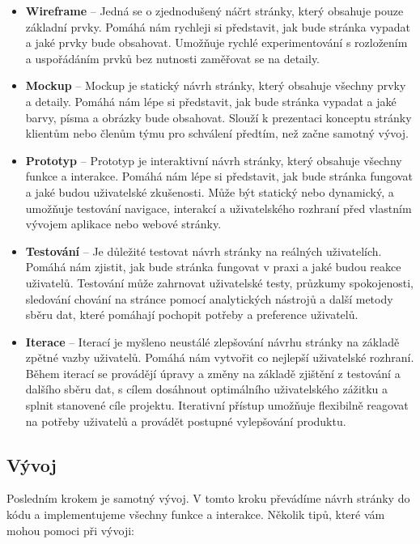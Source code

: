\begin{itemize}
  \item \textbf{Wireframe} -- Jedná se o zjednodušený náčrt stránky, který obsahuje pouze základní prvky. Pomáhá nám rychleji si představit, jak bude stránka vypadat a jaké prvky bude obsahovat. Umožňuje rychlé experimentování s rozložením a uspořádáním prvků bez nutnosti zaměřovat se na detaily.
  \item \textbf{Mockup} -- Mockup je statický návrh stránky, který obsahuje všechny prvky a detaily. Pomáhá nám lépe si představit, jak bude stránka vypadat a jaké barvy, písma a obrázky bude obsahovat. Slouží k prezentaci konceptu stránky klientům nebo členům týmu pro schválení předtím, než začne samotný vývoj.
  \item \textbf{Prototyp} -- Prototyp je interaktivní návrh stránky, který obsahuje všechny funkce a interakce. Pomáhá nám lépe si představit, jak bude stránka fungovat a jaké budou uživatelské zkušenosti. Může být statický nebo dynamický, a umožňuje testování navigace, interakcí a uživatelského rozhraní před vlastním vývojem aplikace nebo webové stránky.
  \item \textbf{Testování} -- Je důležité testovat návrh stránky na reálných uživatelích. Pomáhá nám zjistit, jak bude stránka fungovat v praxi a jaké budou reakce uživatelů. Testování může zahrnovat uživatelské testy, průzkumy spokojenosti, sledování chování na stránce pomocí analytických nástrojů a další metody sběru dat, které pomáhají pochopit potřeby a preference uživatelů.
  \item \textbf{Iterace} -- Iterací je myšleno neustálé zlepšování návrhu stránky na základě zpětné vazby uživatelů. Pomáhá nám vytvořit co nejlepší uživatelské rozhraní. Během iterací se provádějí úpravy a změny na základě zjištění z testování a dalšího sběru dat, s cílem dosáhnout optimálního uživatelského zážitku a splnit stanovené cíle projektu. Iterativní přístup umožňuje flexibilně reagovat na potřeby uživatelů a provádět postupné vylepšování produktu.
\end{itemize}

\subsection{Vývoj}
\label{subsec:development}

Posledním krokem je samotný vývoj. V tomto kroku převádíme návrh stránky do kódu a implementujeme všechny funkce a interakce. Několik tipů, které vám mohou pomoci při vývoji:

